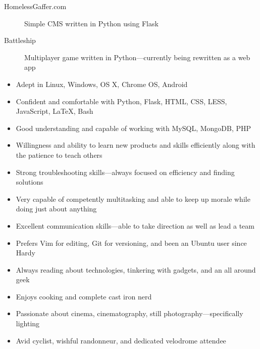 \documentclass[letterpaper]{article}        %
\begin{document}
  
  
  
  



  \begin{description}
    \item[HomelessGaffer.com] Simple CMS written in Python using Flask
    \item[Battleship] Multiplayer game written in Python---currently being rewritten as a web app
    
  \end{description}





  \begin{multicols}{2}
    \begin{itemize}
    
    \item Adept in Linux, Windows, OS X, Chrome OS, Android
    
    \item Confident and comfortable with Python, Flask, HTML, CSS, LESS, JavaScript, \LaTeX{}, Bash
    
    \item Good understanding and capable of working with MySQL, MongoDB, PHP
    
    \item Willingness and ability to learn new products and skills efficiently along with the patience to teach others
    
    \item Strong troubleshooting skills---always focused on efficiency and finding solutions
    
    \item Very capable of competently multitasking and able to keep up morale while doing just about anything
    
    \item Excellent communication skills---able to take direction as well as lead a team
    
    \item Prefers Vim for editing, Git for versioning, and been an Ubuntu user since Hardy
    
    \item Always reading about technologies, tinkering with gadgets, and an all around geek
    
    \item Enjoys cooking and complete cast iron nerd
    
    \item Passionate about cinema, cinematography, still photography---specifically lighting
    
    \item Avid cyclist, wishful randonneur, and dedicated velodrome attendee
    
    \end{itemize}
  \end{multicols}
\end{document}
